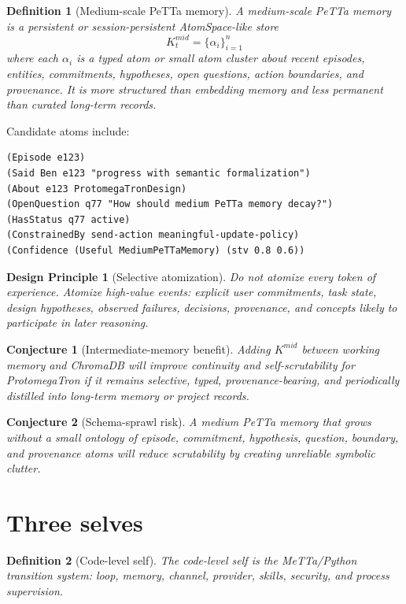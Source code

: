 \documentclass[11pt]{article}
\newtheorem{definition}{Definition}
\newtheorem{conjecture}{Conjecture}
\newtheorem{designprinciple}{Design Principle}
\begin{document}
\begin{definition}[Medium-scale PeTTa memory]
A medium-scale PeTTa memory is a persistent or session-persistent AtomSpace-like store
\[
  K^{mid}_t = \{\alpha_i\}_{i=1}^{n}
\]
where each $\alpha_i$ is a typed atom or small atom cluster about recent episodes,
entities, commitments, hypotheses, open questions, action boundaries, and provenance.
It is more structured than embedding memory and less permanent than curated long-term
records.
\end{definition}

Candidate atoms include:
\begin{verbatim}
(Episode e123)
(Said Ben e123 "progress with semantic formalization")
(About e123 ProtomegaTronDesign)
(OpenQuestion q77 "How should medium PeTTa memory decay?")
(HasStatus q77 active)
(ConstrainedBy send-action meaningful-update-policy)
(Confidence (Useful MediumPeTTaMemory) (stv 0.8 0.6))
\end{verbatim}

\begin{designprinciple}[Selective atomization]
Do not atomize every token of experience.  Atomize high-value events: explicit user
commitments, task state, design hypotheses, observed failures, decisions, provenance,
and concepts likely to participate in later reasoning.
\end{designprinciple}

\begin{conjecture}[Intermediate-memory benefit]
Adding $K^{mid}$ between working memory and ChromaDB will improve continuity and
self-scrutability for ProtomegaTron if it remains selective, typed, provenance-bearing,
and periodically distilled into long-term memory or project records.
\end{conjecture}

\begin{conjecture}[Schema-sprawl risk]
A medium PeTTa memory that grows without a small ontology of episode, commitment,
hypothesis, question, boundary, and provenance atoms will reduce scrutability by creating
unreliable symbolic clutter.
\end{conjecture}

\section{Three selves}

\begin{definition}[Code-level self]
The code-level self is the MeTTa/Python transition system: loop, memory, channel,
provider, skills, security, and process supervision.
\end{definition}
\end{document}
